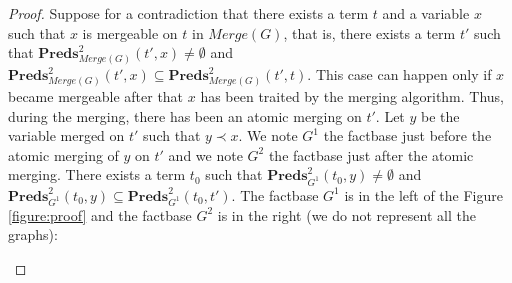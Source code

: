 \documentclass{article}
\theoremstyle{definition}
\theoremstyle{remark}
\newcommand{\Preds}{\textbf{Preds}}
\newcommand{\Merge}{\textit{Merge}}
\begin{document}
\begin{proof} 
Suppose for a contradiction that there exists a term $t$ and a variable $x$ such that $x$ is mergeable on $t$ in $\Merge(G)$, that is, there exists a term $t'$ such that $\Preds^2_{\Merge(G)}(t',x) \neq \emptyset$ and $\Preds_{\Merge(G)}^2(t',x) \subseteq \Preds_{\Merge(G)}^2(t',t)$. This case can happen only if $x$ became mergeable after that $x$ has been traited by the merging algorithm. Thus, during the merging, there has been an atomic merging on $t'$. Let $y$ be the variable merged on $t'$ such that $y \prec x$. We note $G^1$ the factbase just before the atomic merging of $y$ on $t'$ and we note $G^2$ the factbase just after the atomic merging. There exists a term $t_0$ such that $\Preds^2_{G^1}(t_0,y) \neq \emptyset$ and $\Preds_{G^1}^2(t_0,y) \subseteq \Preds_{G^1}^2(t_0,t')$. The factbase $G^1$ is in the left of the Figure \ref{figure:proof} and the factbase $G^2$ is in the right (we do not represent all the graphs):

\begin{figure}
\begin{center}
\end{center}
\end{figure}
\end{proof}
\end{document}
